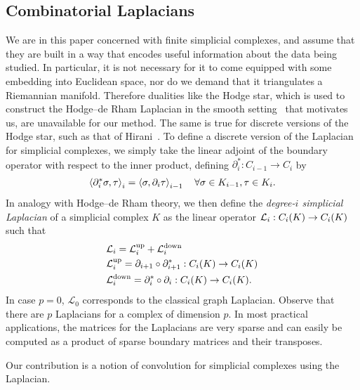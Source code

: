 \subsection{Combinatorial Laplacians}
We are in this paper concerned with finite simplicial complexes, and assume that they are built in a way that encodes useful information about the data being studied. In particular, it is not necessary for it to come equipped with some embedding into Euclidean space, nor do we demand that it triangulates a Riemannian manifold. Therefore dualities like the Hodge star, which is used to construct the Hodge--de Rham Laplacian in the smooth setting~\cite{madsen1997calculus} that motivates us, are unavailable for our method. The same is true for discrete versions of the Hodge star, such as that of Hirani~\cite{hirani2003thesis}. To define a discrete version of the Laplacian for simplicial complexes, we simply take the linear adjoint of the boundary operator with respect to the inner product, defining $\partial_i^\ast:C_{i-1}\to C_i$ by
\begin{align*}
  \left\langle \partial_i^\ast \sigma , \tau \right\rangle_i = \left\langle \sigma , \partial_i \tau \right\rangle_{i-1} \quad \forall \sigma\in K_{i-1}, \tau\in K_i.
\end{align*}
In analogy with Hodge--de Rham theory, we then define the \emph{degree-$i$ simplicial Laplacian} of a simplicial complex $K$ as the linear operator $\mathcal{L}_i:C_i(K)\to C_i(K)$ such that
\begin{align*}
  &\mathcal{L}_i = \mathcal{L}^{\text{up}}_i + \mathcal{L}^{\text{down}}_i\\
  &\mathcal{L}^{\text{up}}_i =  \partial_{i+1}\circ\partial_{i+1}^\ast : C_i(K)\to C_i(K) \\
  &\mathcal{L}^{\text{down}}_i = \partial_i^\ast\circ\partial_i : C_i(K)\to C_i(K).
\end{align*}
In case $p=0$, $\mathcal{L}_0$ corresponds to the classical graph Laplacian. Observe that there are $p$ Laplacians for a complex of dimension $p$. In most practical applications, the matrices for the Laplacians are very sparse and can easily be computed as a product of sparse boundary matrices and their transposes.


Our contribution is a notion of convolution for simplicial complexes using the Laplacian.


